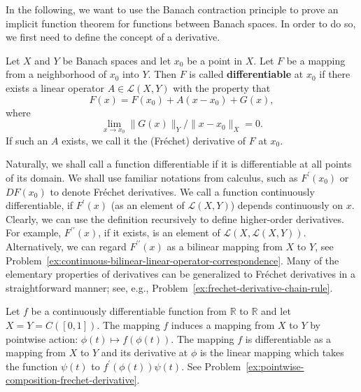In the following, we want to use the Banach contraction principle to prove an implicit function theorem for functions between Banach spaces. In order to do so, we first need to define the concept of a derivative.

\begin{Definition}
\label{def:frechet-derivative}
Let $X$ and $Y$ be Banach spaces and let $x_0$ be a point in $X$. Let $F$ be a mapping from a neighborhood of $x_0$ into $Y$. Then $F$ is called \textbf{differentiable} at $x_0$ if there exists a linear operator $A\in\mathcal{L}(X,Y)$ with the property that
\begin{equation}\label{eq:frechet-differentiability-linear-remainder-expansion}
F(x)=F(x_0)+A(x-x_0)+G(x),
\end{equation}
where
\begin{equation}\label{eq:frechet-differentiability-vanishing-relative-remainder}
\lim_{x\to x_0}\|G(x)\|_Y/\|x-x_0\|_X=0.
\end{equation}
If such an $A$ exists, we call it the (Fréchet) derivative of $F$ at $x_0$.
\end{Definition}

Naturally, we shall call a function differentiable if it is differentiable at all points of its domain. We shall use familiar notations from calculus, such as $F^{\prime}(x_0)$ or $DF(x_0)$ to denote Fréchet derivatives. We call a function continuously differentiable, if $F^{\prime}(x)$ (as an element of $\mathcal{L}(X,Y)$) depends continuously on $x$. Clearly, we can use the definition recursively to define higher-order derivatives. For example, $F^{\prime\prime}(x)$, if it exists, is an element of $\mathcal{L}(X,\mathcal{L}(X,Y))$. Alternatively, we can regard $F^{\prime\prime}(x)$ as a bilinear mapping from $X$ to $Y$, see Problem~\ref{ex:continuous-bilinear-linear-operator-correspondence}. Many of the elementary properties of derivatives can be generalized to Fréchet derivatives in a straightforward manner; see, e.g., Problem~\ref{ex:frechet-derivative-chain-rule}.

\begin{Example}
\label{ex:pointwise-composition-frechet-derivative-example}
Let $f$ be a continuously differentiable function from $\mathbb{R}$ to $\mathbb{R}$ and let $X=Y=C([0,1])$. The mapping $f$ induces a mapping from $X$ to $Y$ by pointwise action: $\phi(t)\mapsto f(\phi(t))$. The mapping $f$ is differentiable as a mapping from $X$ to $Y$ and its derivative at $\phi$ is the linear mapping which takes the function $\psi(t)$ to $f^{\prime}(\phi(t))\psi(t)$. See Problem~\ref{ex:pointwise-composition-frechet-derivative}.
\end{Example}

